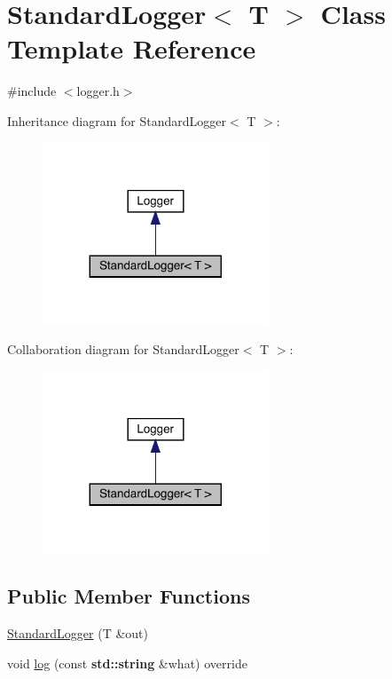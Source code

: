 \hypertarget{class_standard_logger}{}\section{Standard\+Logger$<$ T $>$ Class Template Reference}
\label{class_standard_logger}


{\ttfamily \#include $<$logger.\+h$>$}



Inheritance diagram for Standard\+Logger$<$ T $>$\+:
\nopagebreak
\begin{figure}[H]
\begin{center}
\leavevmode
\includegraphics[width=191pt]{class_standard_logger__inherit__graph}
\end{center}
\end{figure}


Collaboration diagram for Standard\+Logger$<$ T $>$\+:
\nopagebreak
\begin{figure}[H]
\begin{center}
\leavevmode
\includegraphics[width=191pt]{class_standard_logger__coll__graph}
\end{center}
\end{figure}
\subsection*{Public Member Functions}
\begin{DoxyCompactItemize}
\item 
\hyperlink{class_standard_logger_a2c81129e394334f40058d0fc38d427ab}{Standard\+Logger} (T \&out)
\item 
void \hyperlink{class_standard_logger_af09ac6658b0c4826d1b3bd3292736184}{log} (const \textbf{ std\+::string} \&what) override
\end{DoxyCompactItemize}


